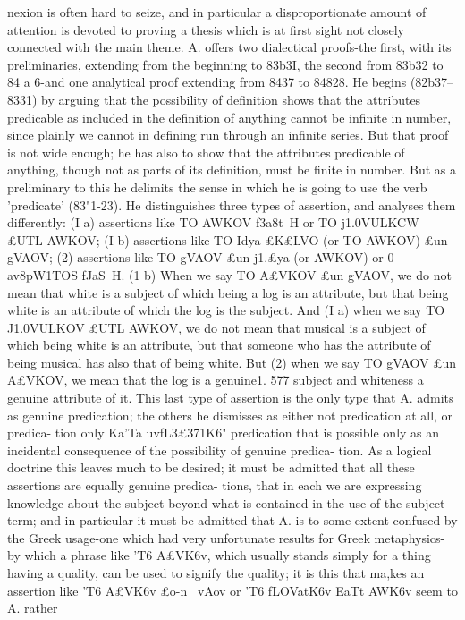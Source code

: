 {{{{{{{{{{{{{{{{{nexion is often hard to seize, and in particular a disproportionate
amount of attention is devoted to proving a thesis which is at
first sight not closely connected with the main theme. A. offers
two dialectical proofs-the first, with its preliminaries, extending
from the beginning to 83b3I, the second from 83b32 to 84 a 6-and
one analytical proof extending from 8437 to 84828.
He begins (82b37--8331) by arguing that the possibility of
definition shows that the attributes predicable as included in
the definition of anything cannot be infinite in number, since
plainly we cannot in defining run through an infinite series. But
that proof is not wide enough; he has also to show that the
attributes predicable of anything, though not as parts of its
definition, must be finite in number. But as a preliminary to
this he delimits the sense in which he is going to use the verb
'predicate' (83"1-23). He distinguishes three types of assertion,
and analyses them differently: (I a) assertions like TO AWKOV
f3a8t~H or TO j1.0VULKCW £UTL AWKOV; (I b) assertions like TO Idya
£K£LVO (or TO AWKOV) £un gVAOV; (2) assertions like TO gVAOV £un
j1.£ya (or AWKOV) or 0 av8pW1TOS fJaS{~H. (1 b) When we say TO
A£VKOV £un gVAOV, we do not mean that white is a subject of
which being a log is an attribute, but that being white is an
attribute of which the log is the subject. And (I a) when we say
TO J1.0VULKOV £UTL AWKOV, we do not mean that musical is a subject
of which being white is an attribute, but that someone who has the
attribute of being musical has also that of being white. But (2)
when we say TO gVAOV £un A£VKOV, we mean that the log is a genuine1.
577
subject and whiteness a genuine attribute of it. This last type
of assertion is the only type that A. admits as genuine predication;
the others he dismisses as either not predication at all, or predica-
tion only Ka'Ta uvfL{3£{371K6" predication that is possible only as
an incidental consequence of the possibility of genuine predica-
tion. As a logical doctrine this leaves much to be desired; it must
be admitted that all these assertions are equally genuine predica-
tions, that in each we are expressing knowledge about the subject
beyond what is contained in the use of the subject-term; and in
particular it must be admitted that A. is to some extent confused
by the Greek usage-one which had very unfortunate results
for Greek metaphysics-by which a phrase like 'T6 A£VK6v, which
usually stands simply for a thing having a quality, can be used
to signify the quality; it is this that ma,kes an assertion like 'T6
A£VK6v £o-n ~vAov or 'T6 fLOVatK6v EaTt AWK6v seem to A. rather
}}}}}}}}}}}}}}}}}}}}
